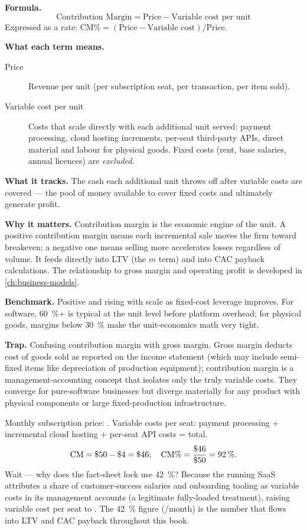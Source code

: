 \textbf{Formula.}
\[
  \text{Contribution Margin} = \text{Price} - \text{Variable cost per unit}
\]
Expressed as a rate: $\text{CM\%} = (\text{Price} - \text{Variable cost})/\text{Price}$.

\textbf{What each term means.}
\begin{description}
  \item[Price] Revenue per unit (per subscription seat, per transaction, per item sold).
  \item[Variable cost per unit] Costs that scale directly with each additional unit served:
    payment processing, cloud hosting increments, per-seat third-party APIs, direct material
    and labour for physical goods. Fixed costs (rent, base salaries, annual licences) are
    \emph{excluded}.
\end{description}

\textbf{What it tracks.} The cash each additional unit throws off after variable costs are
covered --- the pool of money available to cover fixed costs and ultimately generate profit.

\textbf{Why it matters.} Contribution margin is the economic engine of the unit. A
positive contribution margin means each incremental sale moves the firm toward breakeven; a
negative one means selling more accelerates losses regardless of volume. It feeds directly
into LTV (the $m$ term) and into CAC payback calculations. The relationship to gross margin
and operating profit is developed in \cref{ch:business-models}.

\textbf{Benchmark.} Positive and rising with scale as fixed-cost leverage improves. For
software, \qty{60}{\percent}+ is typical at the unit level before platform overhead; for
physical goods, margins below \qty{30}{\percent} make the unit-economics math very tight.

\textbf{Trap.} Confusing contribution margin with gross margin. Gross margin deducts cost
of goods sold as reported on the income statement (which may include semi-fixed items like
depreciation of production equipment); contribution margin is a management-accounting concept
that isolates only the truly variable costs. They converge for pure-software businesses but
diverge materially for any product with physical components or large fixed-production
infrastructure.

\begin{example}
Monthly subscription price: . Variable costs per seat: payment processing
 + incremental cloud hosting  + per-seat API costs 
=  total.
\[
  \text{CM} = \$\num{50} - \$\num{4} = \$\num{46}; \quad
  \text{CM\%} = \frac{\$\num{46}}{\$\num{50}} = \qty{92}{\percent}.
\]
Wait --- why does the fact-sheet lock use \qty{42}{\percent}? Because the running SaaS
attributes a share of customer-success salaries and onboarding tooling as variable costs in
its management accounts (a legitimate fully-loaded treatment), raising variable cost per seat
to . The \qty{42}{\percent} figure (/month) is the number that flows into
LTV and CAC payback throughout this book.
\end{example}


